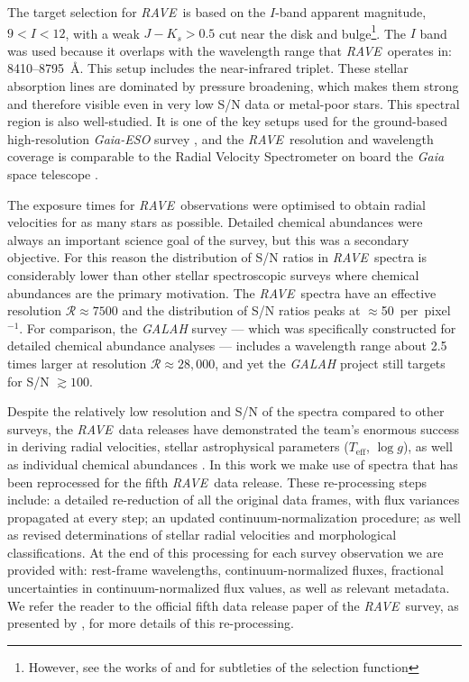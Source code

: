 \documentclass[preprint,trackchanges]{aastex}
\newcommand{\project}[1]{\textsl{#1}}
\newcommand{\rave}{\project{\acronym{RAVE}}}
\newcommand{\acronym}[1]{{\small{#1}}}
\newcommand{\teff}{T_{\mathrm{eff}}}
\newcommand{\logg}{\log g}
\begin{document}
The target selection for \rave\ is based on the $I$-band apparent magnitude,
$9 < I < 12$, with a weak $J - K_s > 0.5$ cut near the disk and bulge\footnote{
However, see the works of \citet{Kunder_2016} and \citet{Kordopatis_2013} for 
subtleties of the selection function}.
The $I$ band was used because it overlaps with the wavelength range 
that \rave\ operates in:  8410--8795~\AA.  This setup includes the  
near-infrared triplet.  These stellar absorption lines are dominated by pressure 
broadening, which makes them strong and therefore visible even in very low S/N data
or metal-poor stars.  This spectral region is also well-studied.  It is one of the
key setups used for the ground-based high-resolution \project{Gaia-ESO} survey
\citep{Gilmore_2012,Randich_2013}, and the \rave\ resolution and wavelength
coverage is comparable to the Radial Velocity Spectrometer on board the \project{Gaia}
space telescope \citep{Recio-Blanco_2016}.


The exposure times for \rave\ observations were optimised to obtain radial 
velocities for as many stars as possible.  Detailed chemical abundances were
always an important science goal of the survey, but this was a secondary objective.  
For this reason the distribution of S/N ratios in \rave\ spectra is considerably 
lower than other stellar spectroscopic surveys where chemical abundances are the 
primary motivation.  The \rave\ spectra have an effective resolution 
$\mathcal{R} \approx 7500$ and the distribution of S/N ratios peaks at 
$\approx$50~per~pixel$^{-1}$.  For comparison, the \project{GALAH} survey 
\citep{DeSilva_2015} --- which was specifically constructed for detailed chemical 
abundance analyses --- includes a wavelength range about 2.5 times larger at 
resolution $\mathcal{R} \approx 28,000$, and yet the \project{GALAH} project still 
targets for S/N $\gtrsim100$.


Despite the relatively low resolution and S/N of the spectra compared to other
surveys, the \rave\ data releases have demonstrated the team's enormous success 
in deriving radial velocities, stellar astrophysical parameters ($\teff$, $\logg$),
as well as individual chemical abundances \citep{Steinmetz_2006,Zwitter_2008,
Siebert_2011,Kordopatis_2013, Kunder_2016}.  In this work we make use of spectra
that has been reprocessed for the fifth \rave\ data release.  These re-processing
steps include: a detailed re-reduction of all the original data frames, with flux
variances propagated at every step; an updated continuum-normalization procedure;
as well as revised determinations of stellar radial velocities and morphological
classifications. At the end of this processing for each survey observation we are 
provided with: rest-frame wavelengths, continuum-normalized fluxes, fractional 
uncertainties in continuum-normalized flux values, as well as relevant metadata.  
We refer the reader to the official fifth data release paper of the \rave\ survey, 
as presented by \citet{Kunder_2016}, for more details of this re-processing.
\end{document}
